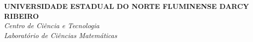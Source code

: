 \documentclass[
	12pt,				%
	oneside, %
	a4paper,			%
	english,			%
	french,				%
	spanish,			%
	brazil				%
	]{abntex2}
\begin{document}

\frenchspacing

\pretextual

\begin{center}
\large
\textbf{UNIVERSIDADE ESTADUAL DO NORTE FLUMINENSE DARCY RIBEIRO} \\
\textit{Centro de Ciência e Tecnologia\\
Laboratório de Ciências Matemáticas\\}
\end{center}
\vspace{2.5cm}

\imprimircapa


\end{document}
